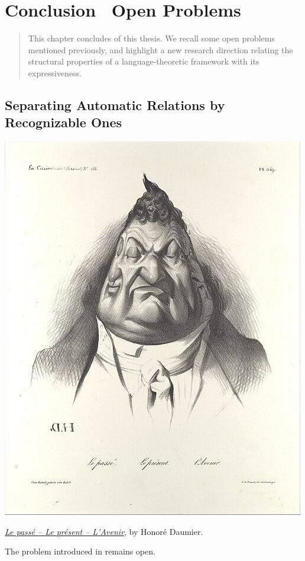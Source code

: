 \chapter[Conclusion \&~Open Problems]{Conclusion \fancyand~Open Problems}
\label{ch:conclu-automatic}
\renewcommand\thefigure{\thechapter.\arabic{figure}}

\begin{chapterpresentation}
	\begin{abstract}
		This chapter concludes  of this thesis.
		We recall some open problems mentioned previously,
		and highlight a new research direction relating the
		structural properties of a language-theoretic framework
		with its expressiveness.
	\end{abstract}
	\par\bigskip\bigskip
	\chaptertoc
\end{chapterpresentation}

\section{Separating Automatic Relations by Recognizable Ones}

\begin{marginfigure}
	\centering
	\includegraphics[width=\linewidth]{fig/PastPresentFuture.jpg}
	\caption{\href{https://www.metmuseum.org/art/collection/search/365043}{\emph{Le passé – Le présent – L'Avenir}}, by Honoré Daumier.}
\end{marginfigure}
The problem introduced in 
remains open.

